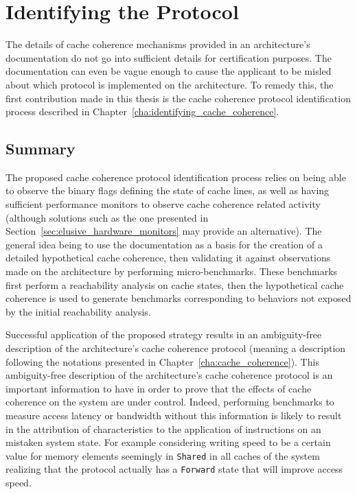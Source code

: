 \section{Identifying the Protocol}
The details of cache coherence mechanisms provided in an architecture's
documentation do not go into sufficient details for certification purposes. The
documentation can even be vague enough to cause the applicant to be misled
about which protocol is implemented on the architecture.  To remedy this, the
first contribution made in this thesis is the cache coherence protocol
identification process described in
Chapter~\ref{cha:identifying_cache_coherence}.

\subsection{Summary}
The proposed cache coherence protocol identification process relies on being
able to observe the binary flags defining the state of cache lines, as well as
having sufficient performance monitors to observe cache coherence related
activity (although solutions such as the one presented in
Section~\ref{sec:elusive_hardware_monitors} may provide an alternative). The
general idea being to use the documentation as a basis for the creation of a
detailed hypothetical cache coherence, then validating it against observations
made on the architecture by performing micro-benchmarks. These benchmarks first
perform a reachability analysis on cache states, then the hypothetical cache
coherence is used to generate benchmarks corresponding to behaviors not exposed
by the initial reachability analysis.

Successful application of the proposed strategy results in an ambiguity-free
description of the architecture's cache coherence protocol (meaning a
description following the notations presented in
Chapter~\ref{cha:cache_coherence}).  This ambiguity-free description of the
architecture's cache coherence protocol is an important information to have in
order to prove that the effects of cache coherence on the system are under
control. Indeed, performing benchmarks to measure access latency or bandwidth
without this information is likely to result in the attribution of
characteristics to the application of instructions on an mistaken system state.
For example considering writing speed to be a certain value for memory elements
seemingly in \texttt{Shared} in all caches of the system realizing that the
protocol actually has a \texttt{Forward} state that will improve access speed.

